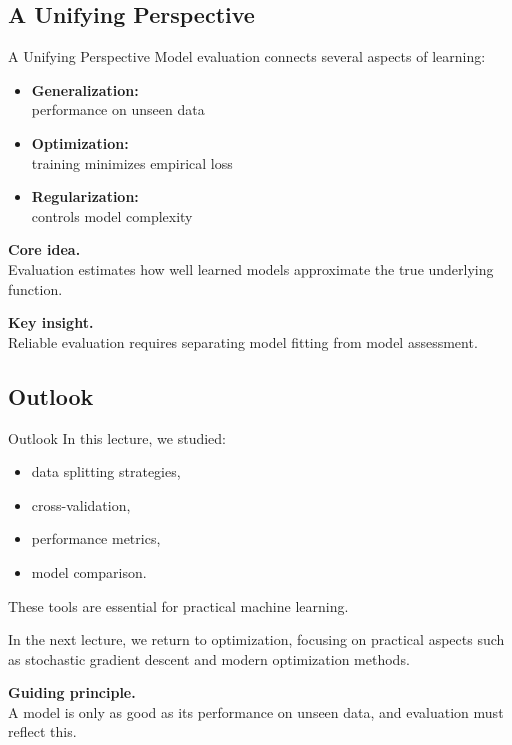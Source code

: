 \documentclass[aspectratio=169,11pt]{beamer}
\begin{document}
\subsection{A Unifying Perspective}
\begin{frame}[t,allowframebreaks]{A Unifying Perspective}
\small
Model evaluation connects several aspects of learning:

\begin{itemize}
    \item \textbf{Generalization:}\\ performance on unseen data
    \item \textbf{Optimization:}\\ training minimizes empirical loss
    \item \textbf{Regularization:}\\ controls model complexity
\end{itemize}

\textbf{Core idea.}\\ Evaluation estimates how well learned models approximate the true underlying function.

\textbf{Key insight.}\\ Reliable evaluation requires separating model fitting from model assessment.
\end{frame}

\subsection{Outlook}
\begin{frame}[t,allowframebreaks]{Outlook}
\small
In this lecture, we studied:

\begin{itemize}
    \item data splitting strategies,
    \item cross-validation,
    \item performance metrics,
    \item model comparison.
\end{itemize}

These tools are essential for practical machine learning.

In the next lecture, we return to optimization, focusing on practical aspects such as stochastic gradient descent and modern optimization methods.

\textbf{Guiding principle.}\\ A model is only as good as its performance on unseen data, and evaluation must reflect this.
\end{frame}
\end{document}
